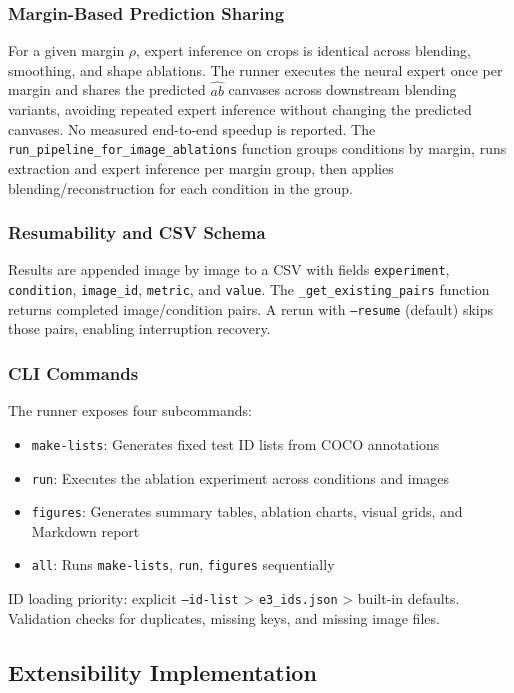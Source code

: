 \documentclass{FastFyp}
\begin{document}
\subsubsection{Margin-Based Prediction Sharing}
For a given margin $\rho$, expert inference on crops is identical across blending, smoothing, and shape ablations. The runner executes the neural expert once per margin and shares the predicted $\widehat{ab}$ canvases across downstream blending variants, avoiding repeated expert inference without changing the predicted canvases. No measured end-to-end speedup is reported. The \texttt{run\_pipeline\_for\_image\_ablations} function groups conditions by margin, runs extraction and expert inference per margin group, then applies blending/reconstruction for each condition in the group.

\subsubsection{Resumability and CSV Schema}
Results are appended image by image to a CSV with fields \texttt{experiment}, \texttt{condition}, \texttt{image\_id}, \texttt{metric}, and \texttt{value}. The \texttt{\_get\_existing\_pairs} function returns completed image/condition pairs. A rerun with \texttt{--resume} (default) skips those pairs, enabling interruption recovery.

\subsubsection{CLI Commands}
The runner exposes four subcommands:
\begin{itemize}
    \item \texttt{make-lists}: Generates fixed test ID lists from COCO annotations
    \item \texttt{run}: Executes the ablation experiment across conditions and images
    \item \texttt{figures}: Generates summary tables, ablation charts, visual grids, and Markdown report
    \item \texttt{all}: Runs \texttt{make-lists}, \texttt{run}, \texttt{figures} sequentially
\end{itemize}
ID loading priority: explicit \texttt{--id-list} > \texttt{e3\_ids.json} > built-in defaults. Validation checks for duplicates, missing keys, and missing image files.

\subsection{Extensibility Implementation}
\label{subsec:extensibility-impl}
\end{document}
